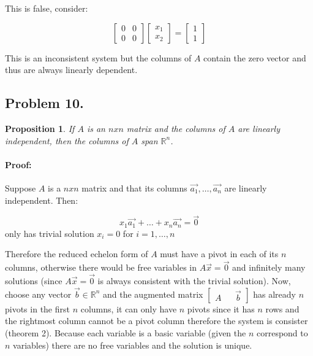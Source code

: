 \documentclass[12pt, letterpaper]{article}
\newcommand{\R}{\mathbb{R}}
\theoremstyle{statement}
\newtheorem*{atmProp}{Proposition}
\newenvironment{atmProof}{\noindent\ignorespaces\paragraph{Proof:}}{\hfill \ding{122}\par\noindent}
\begin{document}
    This is false, consider: 
    
    $$\begin{bmatrix} 0 & 0 \\ 0 & 0 \end{bmatrix}
    \begin{bmatrix} x_1 \\ x_2\end{bmatrix} 
    = \begin{bmatrix} 1 \\ 1\end{bmatrix}$$
    
    This is an inconsistent system but the columns of $A$ contain the zero vector and thus are always linearly dependent.
    
    \subsection*{Problem 10.}
    \begin{atmProp}
    If $A$ is an $n x n$ matrix and the columns of $A$ are linearly independent, then the columns of $A$ span $\R^n$.
    \end{atmProp}
    \begin{atmProof}
    Suppose $A$ is a $nxn$ matrix and that its columns $\vec{a_1}, \dots, \vec{a_n}$ are linearly independent. Then: 
    
    $$x_1\vec{a_1} + \dots + x_n\vec{a_n}=\vec{0}$$
    only has trivial solution $x_i=0$ for $i=1,\dots,n$
    
    Therefore the reduced echelon form of $A$ must have a pivot in each of its $n$ columns, otherwise there would be free variables in $A\vec{x}=\vec{0}$ and infinitely many solutions (since $A\vec{x}=\vec{0}$ is always consistent with the trivial solution). Now, choose any vector $\vec{b} \in \R^n$ and the augmented matrix $\begin{bmatrix} A && \vec{b} \end{bmatrix}$ has already $n$ pivots in the first $n$ columns, it can only have $n$ pivots since it has $n$ rows and the rightmost column cannot be a pivot column therefore the system is consister (theorem 2). Because each variable is a basic variable (given the $n$ correspond to $n$ variables) there are no free variables and the solution is unique.
    \end{atmProof}
 
\end{document}
